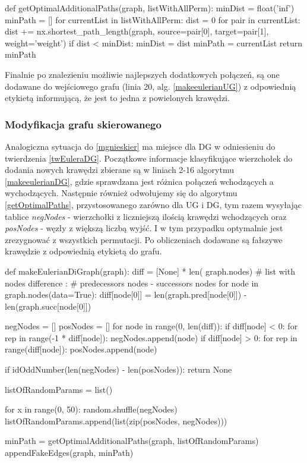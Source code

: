 \documentclass[a4paper, 12pt, twoside, openright]{article}
\begin{document}
\begin{algorithm}[caption={\textit{getOptimalAdditionalPaths} funkcja obliczająca i zwracająca najlepsze pary wierzchołków do połączenia, dla \textit{makeEulerianGraph} i \textit{makeEulerianDiGraph}}, label={getOptimalPaths}]
def getOptimalAdditionalPaths(graph, listWithAllPerm):
	minDist = float('inf')
	minPath = []
	for currentList in listWithAllPerm:
		dist = 0
		for pair in currentList:
			dist += nx.shortest_path_length(graph, source=pair[0], 
			target=pair[1], weight='weight')
		if dist < minDist:
			minDist = dist
			minPath = currentList
	return minPath
\end{algorithm}

	Finalnie po znalezieniu możliwie najlepszych dodatkowych połączeń, są one dodawane do wejściowego grafu (linia 20, alg. \ref{makeeulerianUG}) z odpowiednią etykietą informującą, że jest to jedna z powielonych krawędzi.


\subsubsection{Modyfikacja grafu skierowanego} \label{modSkier}
\indent\par
	Analogiczna sytuacja do \ref{mgnieskier} ma miejsce dla DG w odniesieniu do twierdzenia \ref{twEuleraDG}. Początkowe informacje klasyfikujące wierzchołek do dodania nowych krawędzi zbierane są w liniach 2-16 algorytmu \ref{makeeulerianDG}, gdzie sprawdzana jest różnica połączeń wchodzących a wychodzących. Następnie również odwołujemy się do algorytmu \ref{getOptimalPaths}, przystosowanego zarówno dla UG i DG, tym razem wysyłając tablice \textit{negNodes} - wierzchołki z liczniejszą ilością krawędzi wchodzących oraz \textit{posNodes} - węzły z większą liczbą wyjść. I w tym przypadku optymalnie jest zrezygnować z wszystkich permutacji. Po  obliczeniach dodawane są fałszywe krawędzie z odpowiednią etykietą do grafu.
\begin{algorithm}[caption={\textit{makeEulerianDiGraph} przekształcający graf skierowany do grafu Eulera}, label={makeeulerianDG}]
def makeEulerianDiGraph(graph):
	diff = [None] * len(
			graph.nodes)  # list with nodes difference : 
			    	      # predecessors nodes - successors nodes
	for node in graph.nodes(data=True):
		diff[node[0]] = len(graph.pred[node[0]]) - len(graph.succ[node[0]])
	
	negNodes = []
	posNodes = []
	for node in range(0, len(diff)):
		if diff[node] < 0:
			for rep in range(-1 * diff[node]):
				negNodes.append(node)
		if diff[node] > 0:
			for rep in range(diff[node]):
				posNodes.append(node)
	
	if idOddNumber(len(negNodes) - len(posNodes)):
		return None
	
	listOfRandomParams = list()
	
	for x in range(0, 50):
		random.shuffle(negNodes)
		listOfRandomParams.append(list(zip(posNodes, negNodes)))
	
	minPath = getOptimalAdditionalPaths(graph, listOfRandomParams)
	appendFakeEdges(graph, minPath)   
\end{algorithm}
\end{document}
